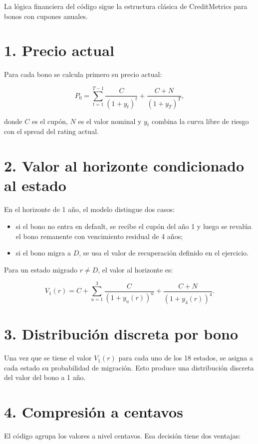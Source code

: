 La l\'ogica financiera del c\'odigo sigue la estructura cl\'asica de CreditMetrics para bonos con cupones anuales.

\section*{1. Precio actual}

Para cada bono se calcula primero su precio actual:

\[
P_0 = \sum_{t=1}^{T-1}\frac{C}{(1+y_t)^t} + \frac{C+N}{(1+y_T)^T},
\]

donde \(C\) es el cup\'on, \(N\) es el valor nominal y \(y_t\) combina la curva libre de riesgo con el spread del rating actual.

\section*{2. Valor al horizonte condicionado al estado}

En el horizonte de 1 a\~no, el modelo distingue dos casos:

\begin{itemize}
  \item si el bono no entra en default, se recibe el cup\'on del a\~no 1 y luego se reval\'ua el bono remanente con vencimiento residual de 4 a\~nos;
  \item si el bono migra a \(D\), se usa el valor de recuperaci\'on definido en el ejercicio.
\end{itemize}

Para un estado migrado \(r \neq D\), el valor al horizonte es:

\[
V_1(r)=C+\sum_{u=1}^{3}\frac{C}{(1+y_u(r))^u}+\frac{C+N}{(1+y_4(r))^4}.
\]

\section*{3. Distribuci\'on discreta por bono}

Una vez que se tiene el valor \(V_1(r)\) para cada uno de los 18 estados, se asigna a cada estado su probabilidad de migraci\'on. Esto produce una distribuci\'on discreta del valor del bono a 1 a\~no.

\section*{4. Compresi\'on a centavos}

El c\'odigo agrupa los valores a nivel centavos. Esa decisi\'on tiene dos ventajas:

